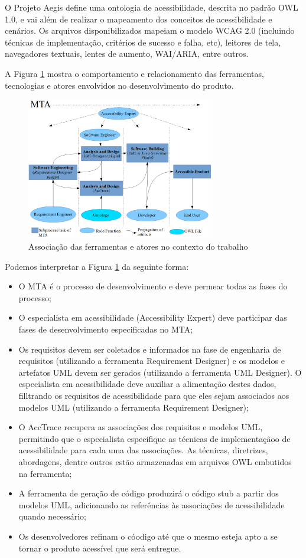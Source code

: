 \documentclass[runningheads,a4paper]{llncs}
\begin{document}
O Projeto Aegis \cite{aegis:13} define uma ontologia de acessibilidade, descrita no padrão OWL 1.0, e vai além de realizar o mapeamento dos conceitos de acessibilidade e cenários. Os arquivos disponibilizados mapeiam o modelo WCAG 2.0 (incluindo técnicas de implementação, critérios de sucesso e falha, etc), leitores de tela, navegadores textuais, lentes de aumento, WAI/ARIA, entre outros.

A Figura \ref{fig:association} mostra o comportamento e relacionamento das ferramentas, tecnologias
e atores envolvidos no desenvolvimento do produto.

\begin{figure}[h]
\centering
\includegraphics[height=6.2cm]{./img/developmentNew2.png}
\caption{Associação das ferramentas e atores no contexto do trabalho}
\label{fig:association}
\end{figure}

Podemos interpretar a Figura \ref{fig:association} da seguinte forma:

\begin{itemize}
  \item O MTA é o processo de desenvolvimento e deve permear todas as fases do processo;
  \item O especialista em acessibilidade (Accessibility Expert) deve participar das fases de
desenvolvimento especificadas no MTA;
  \item Os requisitos devem ser coletados e informados na fase de engenharia de requisitos
(utilizando a ferramenta Requirement Designer) e os modelos e artefatos UML
devem ser gerados (utilizando a ferramenta UML Designer). O especialista em
acessibilidade deve auxiliar a alimentação destes dados, filltrando os requisitos de
acessibilidade para que eles sejam associados aos modelos UML (utilizando a ferramenta
Requirement Designer);
  \item O AccTrace recupera as associações dos requisitos e modelos UML, permitindo que o especialista especifique as técnicas de implementaçãoo de acessibilidade para cada uma das associações. As técnicas, diretrizes, abordagens, dentre outros estão armazenadas em arquivos OWL embutidos na ferramenta;
  \item A ferramenta de geração de código produzirá o código stub a partir dos modelos
UML, adicionando as referências às associações de acessibilidade quando necessário;
  \item Os desenvolvedores refinam o cóodigo até que o mesmo esteja apto a se tornar o
produto acessível que será entregue.
\end{itemize}
\end{document}
